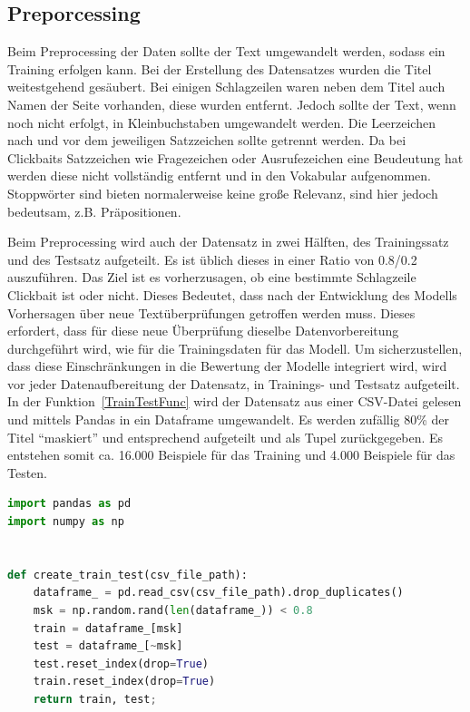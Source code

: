 \subsection{Preporcessing}
Beim Preprocessing der Daten sollte der Text umgewandelt werden, sodass ein Training erfolgen kann. Bei der Erstellung des Datensatzes wurden die Titel weitestgehend gesäubert. Bei einigen Schlagzeilen waren neben dem Titel auch Namen der Seite vorhanden, diese wurden entfernt. Jedoch sollte der Text, wenn noch nicht erfolgt, in Kleinbuchstaben umgewandelt werden. Die Leerzeichen nach und vor dem jeweiligen Satzzeichen sollte getrennt werden. Da bei Clickbaits Satzzeichen wie Fragezeichen oder Ausrufezeichen eine Beudeutung hat werden diese nicht vollständig entfernt und in den Vokabular aufgenommen. Stoppwörter sind bieten normalerweise keine große Relevanz, sind hier jedoch bedeutsam, z.B. Präpositionen.

Beim Preprocessing wird auch der Datensatz in zwei Hälften, des Trainingssatz und des Testsatz aufgeteilt. Es ist üblich dieses in einer Ratio von 0.8/0.2 auszuführen. Das Ziel ist es vorherzusagen, ob eine bestimmte Schlagzeile Clickbait ist oder nicht. Dieses Bedeutet, dass nach der Entwicklung des Modells Vorhersagen über neue Textüberprüfungen getroffen werden muss. Dieses erfordert, dass für diese neue Überprüfung dieselbe Datenvorbereitung durchgeführt wird, wie für die Trainingsdaten für das Modell. Um sicherzustellen, dass diese Einschränkungen in die Bewertung der Modelle integriert wird, wird vor jeder Datenaufbereitung der Datensatz, in Trainings- und Testsatz aufgeteilt. In der Funktion~\ref{TrainTestFunc} wird der Datensatz aus einer CSV-Datei gelesen und mittels Pandas in ein Dataframe umgewandelt. Es werden zufällig 80\% der Titel \enquote{maskiert} und entsprechend aufgeteilt und als Tupel zurückgegeben. Es entstehen somit ca. 16.000 Beispiele für das Training und 4.000 Beispiele für das Testen.

\begin{lstlisting}[language=Python,caption=Funktion für das Aufteilen des Datensatzes]
import pandas as pd
import numpy as np


def create_train_test(csv_file_path):
    dataframe_ = pd.read_csv(csv_file_path).drop_duplicates()
    msk = np.random.rand(len(dataframe_)) < 0.8
    train = dataframe_[msk]
    test = dataframe_[~msk]
    test.reset_index(drop=True)
    train.reset_index(drop=True)
    return train, test;
\end{lstlisting}\label{TrainTestFunc}

